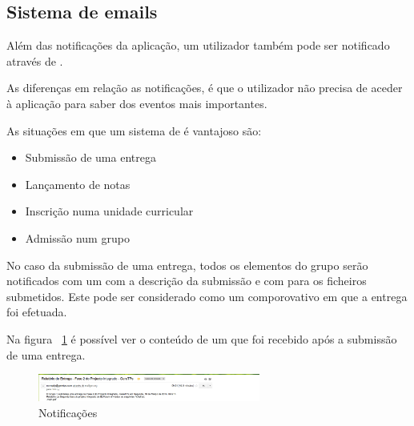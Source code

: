 \subsection{Sistema de emails}

Além das notificações da aplicação, um utilizador também pode ser notificado através de .

As diferenças em relação as notificações, é que o utilizador não precisa de aceder à aplicação para saber dos eventos mais importantes.

As situações em que um sistema de  é vantajoso são:

\begin{itemize}
	\item Submissão de uma entrega
	\item Lançamento de notas
	\item Inscrição numa unidade curricular
	\item Admissão num grupo
\end{itemize}

No caso da submissão de uma entrega, todos os elementos do grupo serão notificados com um  com a descrição da submissão e com  para os ficheiros submetidos. Este  pode ser considerado como um comporovativo em que a entrega foi efetuada.

Na figura ~\ref{fig:mail} é possível ver o conteúdo de um  que foi recebido após a submissão de uma entrega.

\begin{figure}[H]
	\centering
	\includegraphics[width=0.65\textwidth,center]{images/implementacao/alunos/emails}
	\caption{Notificações}
	\label{fig:mail}
\end{figure}
